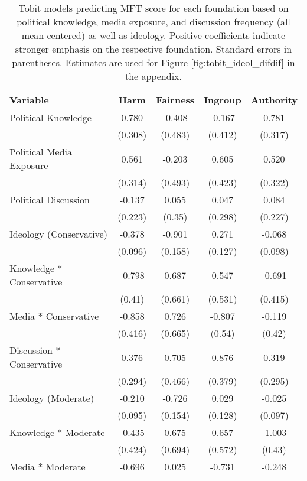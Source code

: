 \begin{table}[ht]
\centering
\caption{Tobit models predicting MFT score for each foundation based 
           on political knowledge, media exposure, and discussion frequency (all mean-centered)
           as well as ideology. Positive coefficients indicate stronger emphasis on the respective
           foundation. Standard errors in parentheses. Estimates are used for Figure
           \ref{fig:tobit_ideol_difdif} in the appendix.} 
\label{tab:tobit_ideol_difdif}
\begingroup\footnotesize
\begin{tabular}{lcccc}
  \hline
Variable & Harm & Fairness & Ingroup & Authority \\ 
  \hline
Political Knowledge &  0.780 & -0.408 & -0.167 &  0.781 \\ 
   & (0.308) & (0.483) & (0.412) & (0.317) \\ 
  Political Media Exposure &  0.561 & -0.203 &  0.605 &  0.520 \\ 
   & (0.314) & (0.493) & (0.423) & (0.322) \\ 
  Political Discussion & -0.137 &  0.055 &  0.047 &  0.084 \\ 
   & (0.223) & (0.35) & (0.298) & (0.227) \\ 
  Ideology (Conservative) & -0.378 & -0.901 &  0.271 & -0.068 \\ 
   & (0.096) & (0.158) & (0.127) & (0.098) \\ 
  Knowledge * Conservative & -0.798 &  0.687 &  0.547 & -0.691 \\ 
   & (0.41) & (0.661) & (0.531) & (0.415) \\ 
  Media * Conservative & -0.858 &  0.726 & -0.807 & -0.119 \\ 
   & (0.416) & (0.665) & (0.54) & (0.42) \\ 
  Discussion * Conservative &  0.376 &  0.705 &  0.876 &  0.319 \\ 
   & (0.294) & (0.466) & (0.379) & (0.295) \\ 
  Ideology (Moderate) & -0.210 & -0.726 &  0.029 & -0.025 \\ 
   & (0.095) & (0.154) & (0.128) & (0.097) \\ 
  Knowledge * Moderate & -0.435 &  0.675 &  0.657 & -1.003 \\ 
   & (0.424) & (0.694) & (0.572) & (0.43) \\ 
  Media * Moderate & -0.696 &  0.025 & -0.731 & -0.248 \\ 

\end{tabular}
\end{table}
